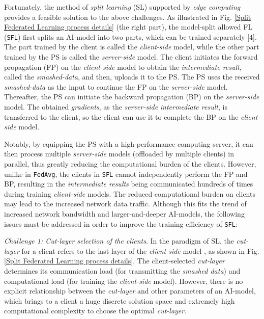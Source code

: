 \documentclass[10pt,journal,transmag]{IEEEtran}
\begin{document}
Fortunately, the method of \textit{split learning} (SL) \cite{GUPTA20181} supported by \textit{edge computing} \cite{GUPTA20181} provides a feasible solution to the above challenges. 
As illustrated in Fig. \ref{Split Federated Learning process details} (the right part), the model-split allowed FL (\texttt{SFL}) first splits an AI-model into two parts, which can be trained separately [4]. The part trained by the client is called the \textit{client-side} model, while the other part trained by the PS is called the \textit{server-side} model. The client initiates the forward propagation (FP) on the \textit{client-side} model to obtain the \textit{intermediate result}, called the \textit{smashed-data}, and then, uploads it to the PS. The PS uses the received \textit{smashed-data} as the input to continue the FP on the \textit{server-side} model.
Thereafter, the PS can initiate the backward propagation (BP) on the \textit{server-side} model. The obtained \textit{gradients}, as the \textit{server-side} \textit{intermediate result}, is transferred to the client, so the client can use it to complete the BP on the \textit{client-side} model.

Notably, by equipping the PS with a high-performance computing server, it can then process multiple \textit{server-side} models (offloaded by multiple clients) in parallel, thus greatly reducing the computational burden of the clients.
However, unlike in \texttt{FedAvg}, the clients in \texttt{SFL} cannot independently perform the FP and BP, resulting in the \textit{intermediate results} being communicated hundreds of times during training \textit{client-side} models.
The reduced computational burden on clients may lead to the increased network data traffic.
Although this fits the trend of increased network bandwidth and larger-and-deeper AI-models, the following issues must be addressed in order to improve the training efficiency of \texttt{SFL}:

\textit{Challenge 1: Cut-layer selection of the clients}. In the paradigm of SL, the \textit{cut-layer} for a client refers to the last layer of the \textit{client-side} model \cite{9812907}, as shown in Fig. \ref{Split Federated Learning process details}. The client-selected \textit{cut-layer} determines its communication load (for transmitting the \textit{smashed data}) and computational load (for training the \textit{client-side} model).
However, there is no explicit relationship between the \textit{cut-layer} and other parameters of an AI-model, which brings to a client a huge discrete solution space and extremely high computational complexity to choose the optimal \textit{cut-layer}.
    
\end{document}
